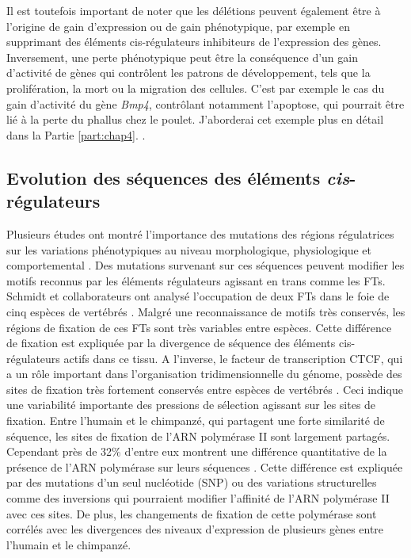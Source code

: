 Il est toutefois important de noter que les délétions peuvent également être à l’origine de gain d'expression ou de gain phénotypique, par exemple en supprimant des éléments \gls{cis}-régulateurs \glspl{inhibiteur} de l’expression des gènes. Inversement, une perte phénotypique peut être la conséquence d’un gain d’activité de gènes qui contrôlent les patrons de développement, tels que la prolifération, la mort ou la migration des cellules. C’est par exemple le cas du gain d’activité du gène \textit{Bmp4}, contrôlant notamment l’apoptose, qui pourrait être lié à la perte du phallus chez le poulet. J'aborderai cet exemple plus en détail dans la Partie \ref{part:chap4}. \citep{herrera_developmental_2013}.

\subsection{Evolution des séquences des éléments \textit{cis}-régulateurs}
\label{subsec:evol-seq-regul}

Plusieurs études ont montré l’importance des mutations des régions régulatrices sur les variations phénotypiques au niveau morphologique, physiologique et comportemental \citep{wray_evolutionary_2007}. Des mutations survenant sur ces séquences peuvent modifier les motifs reconnus par les éléments régulateurs agissant en \gls{trans} comme les \acrshort{FT}s. Schmidt et collaborateurs ont analysé l’occupation de deux \acrshort{FT}s dans le foie de cinq espèces de vertébrés \citep{schmidt_five-vertebrate_2010}. Malgré une reconnaissance de motifs très conservés, les régions de fixation de ces \acrshort{FT}s sont très variables entre espèces. Cette différence de fixation est expliquée par la divergence de séquence des éléments \gls{cis}-régulateurs actifs dans ce tissu. A l’inverse, le facteur de transcription CTCF, qui a un rôle important dans l’organisation tridimensionnelle du génome, possède des sites de fixation très fortement conservés entre espèces de vertébrés \citep{schmidt_waves_2012}. Ceci indique une variabilité importante des pressions de sélection agissant sur les sites de fixation. Entre l’humain et le chimpanzé, qui partagent une forte similarité de séquence, les sites de fixation de l’ARN polymérase II sont largement partagés. Cependant près de 32\% d’entre eux montrent une différence quantitative de la présence de l’ARN polymérase sur leurs séquences \citep{kasowski_variation_2010}. Cette différence est expliquée par des mutations d’un seul nucléotide (SNP) ou des variations structurelles comme des inversions qui pourraient modifier l’affinité de l’ARN polymérase II avec ces sites. De plus, les changements de fixation de cette polymérase sont corrélés avec les divergences des niveaux d’expression de plusieurs gènes entre l’humain et le chimpanzé.

